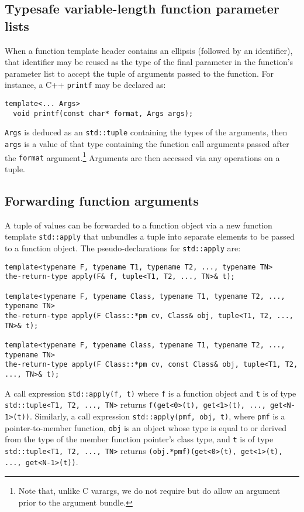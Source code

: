 \documentclass{article}
\begin{document}
\subsection{Typesafe variable-length function parameter lists}
When a function template header contains an ellipsis (followed by an
identifier), that identifier may be reused as the type of the final
parameter in the function's parameter list to accept the tuple of
arguments passed to the function. For instance, a C++ {\tt printf} may
be declared as:
\begin{verbatim}
template<... Args>
  void printf(const char* format, Args args);
\end{verbatim}

{\tt Args} is deduced as an {\tt std::tuple} containing the types of
the arguments, then {\tt args} is a value of that type containing the
function call arguments passed after the {\tt format}
argument.\footnote{Note that, unlike C varargs, we do not require but
  do allow an argument prior to the argument bundle.} Arguments are
then accessed via any operations on a tuple. 

\subsection{Forwarding function arguments}
A tuple of values can be forwarded to a function object via a new
function template {\tt std::apply} that unbundles a tuple into
separate elements to be passed to a function object. The
pseudo-declarations for {\tt std::apply} are:
\begin{verbatim}
template<typename F, typename T1, typename T2, ..., typename TN>
the-return-type apply(F& f, tuple<T1, T2, ..., TN>& t);

template<typename F, typename Class, typename T1, typename T2, ..., typename TN>
the-return-type apply(F Class::*pm cv, Class& obj, tuple<T1, T2, ..., TN>& t);

template<typename F, typename Class, typename T1, typename T2, ..., typename TN>
the-return-type apply(F Class::*pm cv, const Class& obj, tuple<T1, T2, ..., TN>& t);
\end{verbatim}
A call expression {\tt std::apply(f, t)} where {\tt f} is a function
object and {\tt t} is of type {\tt std::tuple<T1, T2, ..., TN>}
returns {\tt f(get<0>(t), get<1>(t), ..., get<N-1>(t))}. Similarly, a
call expression {\tt std::apply(pmf, obj, t)}, where {\tt pmf} is a
pointer-to-member function, {\tt obj} is an object whose type is equal
to or derived from the type of the member function pointer's class
type, and {\tt t} is of type {\tt std::tuple<T1, T2, ..., TN>} returns
{\tt (obj.*pmf)(get<0>(t), get<1>(t), ..., get<N-1>(t))}.
\end{document}
